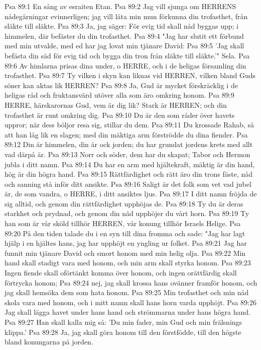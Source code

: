 Psa 89:1  En sång av esraiten Etan.
Psa 89:2  Jag vill sjunga om HERRENS nådegärningar evinnerligen; jag vill låta min mun förkunna din trofasthet, från släkte till släkte.
Psa 89:3  Ja, jag säger: För evig tid skall nåd byggas upp; i himmelen, där befäster du din trofasthet.
Psa 89:4  "Jag har slutit ett förbund med min utvalde, med ed har jag lovat min tjänare David:
Psa 89:5  'Jag skall befästa din säd för evig tid och bygga din tron från släkte till släkte.'" Sela.
Psa 89:6  Av himlarna prisas dina under, o HERRE, och i de heligas församling din trofasthet.
Psa 89:7  Ty vilken i skyn kan liknas vid HERREN, vilken bland Guds söner kan aktas lik HERREN?
Psa 89:8  Ja, Gud är mycket förskräcklig i de heligas råd och fruktansvärd utöver alla som äro omkring honom.
Psa 89:9  HERRE, härskarornas Gud, vem är dig lik? Stark är HERREN; och din trofasthet är runt omkring dig.
Psa 89:10  Du är den som råder över havets uppror; när dess böljor resa sig, stillar du dem.
Psa 89:11  Du krossade Rahab, så att han låg lik en slagen; med din mäktiga arm förströdde du dina fiender.
Psa 89:12  Din är himmelen, din är ock jorden; du har grundat jordens krets med allt vad därpå är.
Psa 89:13  Norr och söder, dem har du skapat; Tabor och Hermon jubla i ditt namn.
Psa 89:14  Du har en arm med hjältekraft, mäktig är din hand, hög är din högra hand.
Psa 89:15  Rättfärdighet och rätt äro din trons fäste, nåd och sanning stå inför ditt ansikte.
Psa 89:16  Saligt är det folk som vet vad jubel är, de som vandra, o HERRE, i ditt ansiktes ljus.
Psa 89:17  I ditt namn fröjda de sig alltid, och genom din rättfärdighet upphöjas de.
Psa 89:18  Ty du är deras starkhet och prydnad, och genom din nåd upphöjer du vårt horn.
Psa 89:19  Ty han som är vår sköld tillhör HERREN, vår konung tillhör Israels Helige.
Psa 89:20  På den tiden talade du i en syn till dina fromma och sade: "Jag har lagt hjälp i en hjältes hans, jag har upphöjt en yngling ur folket.
Psa 89:21  Jag har funnit min tjänare David och smort honom med min helig olja.
Psa 89:22  Min hand skall stadigt vara med honom, och min arm skall styrka honom.
Psa 89:23  Ingen fiende skall oförtänkt komma över honom, och ingen orättfärdig skall förtrycka honom;
Psa 89:24  nej, jag skall krossa hans ovänner framför honom, och jag skall hemsöka dem som hata honom.
Psa 89:25  Min trofasthet och min nåd skola vara med honom, och i mitt namn skall hans horn varda upphöjt.
Psa 89:26  Jag skall lägga havet under hans hand och strömmarna under hans högra hand.
Psa 89:27  Han skall kalla mig så: 'Du min fader, min Gud och min frälsnings klippa.'
Psa 89:28  Ja, jag skall göra honom till den förstfödde, till den högste bland konungarna på jorden.
